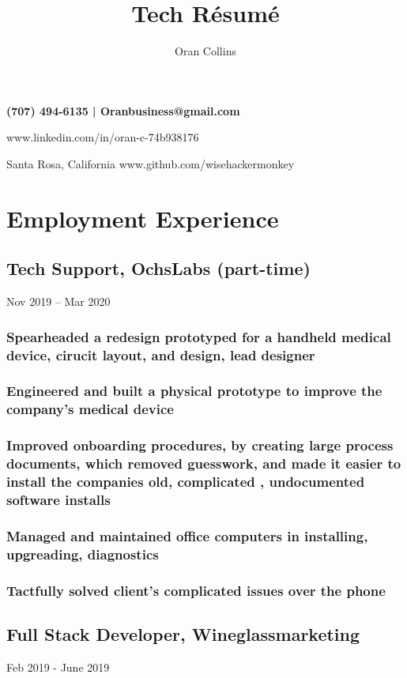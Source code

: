 \documentclass{article}
\makeatletter
\renewcommand{\maketitle}{
\begin{flushleft}
\bfseries
{\Huge\theauthor}\hfill
(707) 494-6135 |  Oranbusiness@gmail.com

\hfill www.linkedin.com/in/oran-c-74b938176

{\hspace{1mm}Santa Rosa, California}\hfill 
www.github.com/wisehackermonkey

\end{flushleft}
}
\makeatother
\begin{document}
\title{Tech R\'esum\'e}
\author{Oran Collins}


\maketitle

\section{Employment Experience}
	 \subsection{Tech Support, OchsLabs (part-time)} Nov 2019 – Mar 2020
        
        \vspace{-2mm}
        \subsubsection{Spearheaded a redesign prototyped for a handheld medical device, cirucit layout, and design, lead designer}
    	\subsubsection{Engineered and built a physical prototype to improve the company's medical device}
		\subsubsection{Improved onboarding procedures, by creating large process documents, which removed guesswork, and made it easier to install the companies old, complicated , undocumented software installs}
    	\subsubsection{Managed and maintained office computers in installing, upgreading, diagnostics}

    	\subsubsection{Tactfully solved client's complicated issues over the phone}
    	

    \subsection{Full Stack Developer, Wineglassmarketing} Feb 2019 - June 2019
	        \vspace{-2mm}
\end{document}
